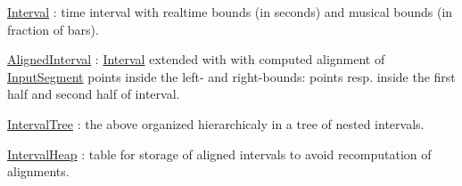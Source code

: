 \begin{DoxyItemize}
\item {\ttfamily \mbox{\hyperlink{classInterval}{Interval}}} \+: time interval with realtime bounds (in seconds) and musical bounds (in fraction of bars).
\item {\ttfamily \mbox{\hyperlink{classAlignedInterval}{Aligned\+Interval}}} \+: {\ttfamily \mbox{\hyperlink{classInterval}{Interval}}} extended with with computed alignment of {\ttfamily \mbox{\hyperlink{classInputSegment}{Input\+Segment}}} points inside the left-\/ and right-\/bounds\+: points resp. inside the first half and second half of interval.
\item {\ttfamily \mbox{\hyperlink{classIntervalTree}{Interval\+Tree}}} \+: the above organized hierarchicaly in a tree of nested intervals.
\item {\ttfamily \mbox{\hyperlink{classIntervalHeap}{Interval\+Heap}}} \+: table for storage of aligned intervals to avoid recomputation of alignments. 
\end{DoxyItemize}